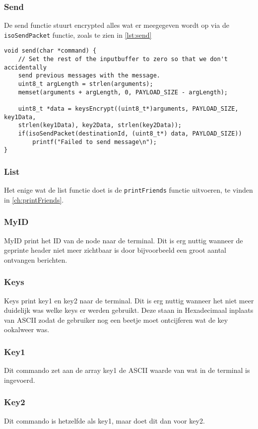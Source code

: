 \subsubsection{Send}
De send functie stuurt encrypted alles wat er meegegeven wordt op via de \texttt{isoSendPacket} functie, zoals te zien in \autoref{lst:send}
\begin{lstlisting}[caption={De send functie},captionpos=b,label={lst:send},style=c,xleftmargin=.\textwidth,xrightmargin=.\textwidth]
void send(char *command) {
    // Set the rest of the inputbuffer to zero so that we don't accidentally 
    send previous messages with the message.
    uint8_t argLength = strlen(arguments);
    memset(arguments + argLength, 0, PAYLOAD_SIZE - argLength);

    uint8_t *data = keysEncrypt((uint8_t*)arguments, PAYLOAD_SIZE, key1Data, 
    strlen(key1Data), key2Data, strlen(key2Data));
    if(isoSendPacket(destinationId, (uint8_t*) data, PAYLOAD_SIZE)) 
        printf("Failed to send message\n");      
}
\end{lstlisting}


\subsubsection{List}
Het enige wat de list functie doet is de \texttt{printFriends} functie uitvoeren, te vinden in \autoref{ch:printFriends}.


\subsubsection{MyID}
MyID print het ID van de node naar de terminal. Dit is erg nuttig wanneer de geprinte header niet meer zichtbaar is door bijvoorbeeld een groot aantal ontvangen berichten.

\subsubsection{Keys}
Keys print key1 en key2 naar de terminal. Dit is erg nuttig wanneer het niet meer duidelijk was welke keys er werden gebruikt. Deze staan in Hexadecimaal inplaats van ASCII zodat de gebruiker nog een beetje moet ontcijferen wat de key ookalweer was.

\subsubsection{Key1}
Dit commando zet aan de array key1 de ASCII waarde van wat in de terminal is ingevoerd. 

\subsubsection{Key2}
Dit commando is hetzelfde als key1, maar doet dit dan voor key2.
